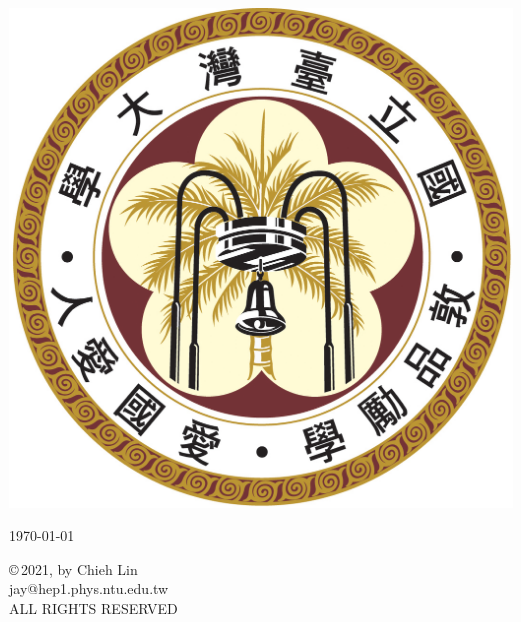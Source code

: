 \documentclass[
11pt, %
english, %
singlespacing, %
nolistspacing, %
liststotoc, %
toctotoc, %
parskip, %
headsepline, %
consistentlayout, %
]{MastersDoctoralThesis} %
\begin{document}
\begin{titlepage}
\begin{center}
\begin{center}
\includegraphics[scale=0.5]{NTU.jpg}
\end{center}  

\vspace{1 cm} 
 
{\Large \today}\\[4cm] %
 
\vfill 
 
\end{center}
\end{titlepage}

\linespread{0}




\clearpage
\vspace*{130mm}
\begin{center}
{%
   \thispagestyle{empty}
   \setlength{\parskip}{\baselineskip}
   \setlength{\parindent}{0pt}
      
   \copyright\,2021, by Chieh Lin \\
   jay@hep1.phys.ntu.edu.tw \\
   ALL RIGHTS RESERVED 
}%
\end{center}


\clearpage

\end{document}
